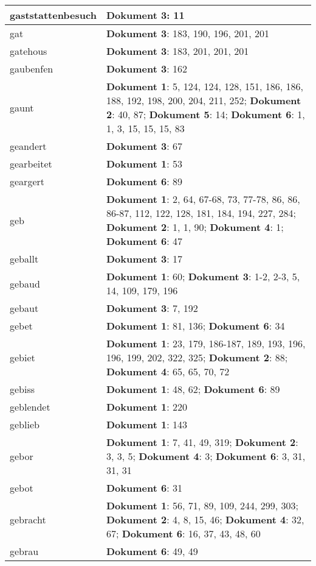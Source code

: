 \documentclass[a5paper]{article}
\begin{document}
\begin{longtable}[l]{|l|p{3in}|}
\hline
gaststattenbesuch & \textbf{Dokument 3}: 11 \\
\hline
gat & \textbf{Dokument 3}: 183, 190, 196, 201, 201 \\
\hline
gatehous & \textbf{Dokument 3}: 183, 201, 201, 201 \\
\hline
gaubenfen & \textbf{Dokument 3}: 162 \\
\hline
gaunt & \textbf{Dokument 1}: 5, 124, 124, 128, 151, 186, 186, 188, 192, 198, 200, 204, 211, 252; \textbf{Dokument 2}: 40, 87; \textbf{Dokument 5}: 14; \textbf{Dokument 6}: 1, 1, 3, 15, 15, 15, 83 \\
\hline
geandert & \textbf{Dokument 3}: 67 \\
\hline
gearbeitet & \textbf{Dokument 1}: 53 \\
\hline
geargert & \textbf{Dokument 6}: 89 \\
\hline
geb & \textbf{Dokument 1}: 2, 64, 67-68, 73, 77-78, 86, 86, 86-87, 112, 122, 128, 181, 184, 194, 227, 284; \textbf{Dokument 2}: 1, 1, 90; \textbf{Dokument 4}: 1; \textbf{Dokument 6}: 47 \\
\hline
geballt & \textbf{Dokument 3}: 17 \\
\hline
gebaud & \textbf{Dokument 1}: 60; \textbf{Dokument 3}: 1-2, 2-3, 5, 14, 109, 179, 196 \\
\hline
gebaut & \textbf{Dokument 3}: 7, 192 \\
\hline
gebet & \textbf{Dokument 1}: 81, 136; \textbf{Dokument 6}: 34 \\
\hline
gebiet & \textbf{Dokument 1}: 23, 179, 186-187, 189, 193, 196, 196, 199, 202, 322, 325; \textbf{Dokument 2}: 88; \textbf{Dokument 4}: 65, 65, 70, 72 \\
\hline
gebiss & \textbf{Dokument 1}: 48, 62; \textbf{Dokument 6}: 89 \\
\hline
geblendet & \textbf{Dokument 1}: 220 \\
\hline
geblieb & \textbf{Dokument 1}: 143 \\
\hline
gebor & \textbf{Dokument 1}: 7, 41, 49, 319; \textbf{Dokument 2}: 3, 3, 5; \textbf{Dokument 4}: 3; \textbf{Dokument 6}: 3, 31, 31, 31 \\
\hline
gebot & \textbf{Dokument 6}: 31 \\
\hline
gebracht & \textbf{Dokument 1}: 56, 71, 89, 109, 244, 299, 303; \textbf{Dokument 2}: 4, 8, 15, 46; \textbf{Dokument 4}: 32, 67; \textbf{Dokument 6}: 16, 37, 43, 48, 60 \\
\hline
gebrau & \textbf{Dokument 6}: 49, 49 \\
\hline

\end{longtable}
\end{document}
